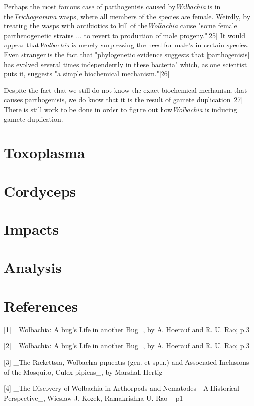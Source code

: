 \documentclass[twocolumn]{article}
\begin{document}
Perhaps the most famous case of parthogenisis caused by\textit{Wolbachia} is in the\textit{Trichogramma} wasps, where all members of the species are female. Weirdly, by treating the wasps with antibiotics to kill of the\textit{Wolbachia} cause "some female parthenogenetic strains ... to revert to production of male progeny."[25] It would appear that\textit{Wolbachia} is merely surpressing the need for male's in certain species. Even stranger is the fact that "phylogenetic evidence suggests that [parthogenisis] has evolved several times independently in these bacteria" which, as one scientist puts it, suggests "a simple biochemical mechanism."[26]  

Despite the fact that we still do not know the exact biochemical mechanism that causes parthogenisis, we do know that it is the result of gamete duplication.[27] There is still work to be done in order to figure out how\textit{Wolbachia} is inducing gamete duplication.

\section*{Toxoplasma}

\section*{Cordyceps}

\section*{Impacts}

\section*{Analysis}

\section*{References}
[1] \_Wolbachia: A bug's Life in another Bug\_, by A. Hoerauf and R. U. Rao;  p.3 

[2] \_Wolbachia: A bug's Life in another Bug\_, by A. Hoerauf and R. U. Rao;  p.3

[3] \_The Rickettsia, Wolbachia pipientis (gen. et sp.n.) and Associated Inclusions of the Mosquito, Culex pipiens\_, by Marshall Hertig

[4] \_The Discovery of Wolbachia in Arthorpods and Nematodes - A Historical Perspective\_, Wieslaw J. Kozek, Ramakrishna U. Rao  -- p1
\end{document}
